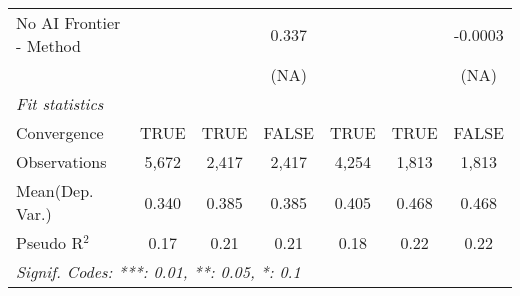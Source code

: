 \begin{tabular}{lcccccc}
   No AI Frontier - Method &               &              & 0.337  &               &               & -0.0003\\   
                           &               &              & (NA)   &               &               & (NA)\\   
   \midrule
   \emph{Fit statistics}\\
   Convergence             &TRUE           & TRUE         & FALSE  & TRUE          & TRUE          & FALSE\\  
   Observations            & 5,672         & 2,417        & 2,417  & 4,254         & 1,813         & 1,813\\  
Mean(Dep. Var.) & 0.340 & 0.385 & 0.385 & 0.405 & 0.468 & 0.468 \\
   Pseudo R$^2$            & 0.17          & 0.21         & 0.21   & 0.18          & 0.22          & 0.22\\  
   \midrule \midrule
   \multicolumn{7}{l}{\emph{Signif. Codes: ***: 0.01, **: 0.05, *: 0.1}}\\
\end{tabular}
\par\endgroup
